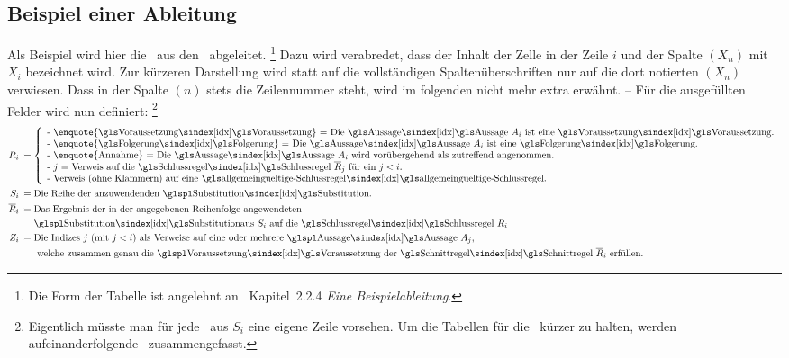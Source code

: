{\subsection{Beispiel einer Ableitung}%
\label{sub:BeispielAbleitung}

Als Beispiel wird hier die \Schnittregel\ aus den \Basisregeln\ abgeleitet.%
\footnote{%
	Die Form der Tabelle ist angelehnt an~\cite{bib:NatuerlichesSchliessen} Kapitel~2.2.4 \emph{Eine Beispielableitung}.
}
Dazu wird verabredet, dass  der Inhalt der Zelle in der Zeile $i$ und der Spalte $(X_n)$ mit $X_i$ bezeichnet wird.
Zur kürzeren Darstellung wird statt auf die vollständigen Spaltenüberschriften nur auf die dort notierten $(X_n)$ verwiesen. Dass in der Spalte $(n)$ stets die Zeilennummer steht, wird im folgenden nicht mehr extra erwähnt.
-- Für die ausgefüllten Felder wird nun definiert:%
\footnote{%
	Eigentlich müsste man für jede \Substitution\ aus $S_i$ eine eigene Zeile vorsehen.
	Um die Tabellen für die \Beweise\ kürzer zu halten, werden aufeinanderfolgende \Substitutionen\ zusammengefasst.
}
\begin{align}
	R_i & \defeq
	\left\{
		\begin{array}{l}
			\text{- \enquote{\Voraussetzung} = Die \Aussage\ $A_i$ ist eine \Voraussetzung.}\\
			\text{- \enquote{\Folgerung} = Die \Aussage\ $A_i$ ist eine \Folgerung.}\\
			\text{- \enquote{Annahme} = Die \Aussage\ $A_i$ wird vorübergehend als zutreffend angenommen.}\\
			\text{- $j$ = Verweis auf die \Schlussregel\ $\overline{R}_j$ für ein $j < i$.}\\
			\text{- Verweis (ohne Klammern) auf eine \allgemeingueltigeSchlussregel.}
		\end{array}
	\right.
	\\
	S_i & \defeq \text{Die Reihe der anzuwendenden \Substitutionen.}
	\\
	\overline{R}_i & \defeq \text{Das Ergebnis der in der angegebenen Reihenfolge angewendeten}\\
	& \quad\;\; \text{\Substitutionen aus $S_i$ auf die \Schlussregel\ $R_i$}
	\\
	Z_i & \defeq \text{Die Indizes $j$ (mit $j < i$) als Verweise auf eine oder mehrere \Aussagen\ $A_j$,}\\
	& \quad\;\;\text{ welche zusammen genau die \Voraussetzungen\ der \Schnittregel\ } \overline{R}_i \text{ erfüllen.}

\end{align}}
